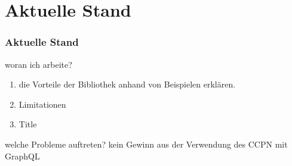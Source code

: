 

\section{Aktuelle Stand}

\begin{frame}{}
    \frametitle{Aktuelle Stand}

    \footnotesize

    \begin{alertblock}{woran ich arbeite?}
        \begin{enumerate}
            \item die Vorteile der Bibliothek anhand von Beispielen erklären.
            \item Limitationen
            \item Title
        \end{enumerate}
    \end{alertblock}

    \begin{block}{welche Probleme auftreten?}
        kein Gewinn aus der Verwendung des CCPN mit GraphQL    
    \end{block}

\end{frame}